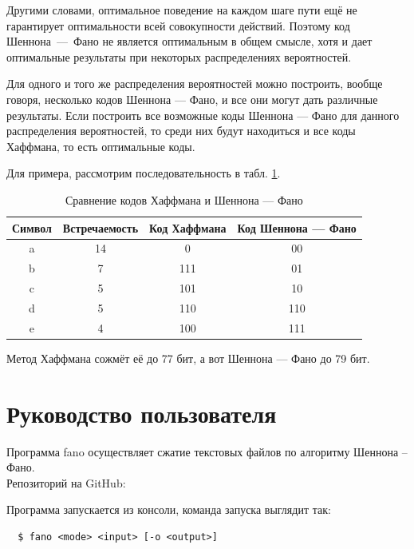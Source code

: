 \documentclass{article}
\begin{document}
Другими словами, 
оптимальное поведение на каждом шаге пути ещё не гарантирует оптимальности всей совокупности действий. 
Поэтому код Шеннона~---~Фано не является оптимальным в общем смысле, хотя и дает оптимальные 
результаты при некоторых распределениях вероятностей. 

Для одного и того же распределения вероятностей 
можно построить, вообще говоря, несколько кодов Шеннона --- Фано, и все они могут дать различные 
результаты. Если построить все возможные коды Шеннона --- Фано для данного распределения вероятностей, 
то среди них будут находиться и все коды Хаффмана, то есть оптимальные коды.

Для примера, рассмотрим последовательность в табл. \ref{hafacomp}. 
\begin{table}
  \begin{center}
    \begin{tabular}{|c|c|c|c|}
      \hline
      Символ & Встречаемость & Код Хаффмана & Код Шеннона --- Фано \\
      \hline
      a & 14 & 0 & 00 \\
      \hline
      b & 7 & 111 & 01 \\
      \hline
      c & 5 & 101 & 10 \\
      \hline
      d & 5 & 110 & 110 \\
      \hline
      e & 4 & 100 & 111 \\
      \hline
    \end{tabular}
    \caption{Сравнение кодов Хаффмана и Шеннона --- Фано\label{hafacomp}}
  \end{center}
\end{table}
Метод Хаффмана сожмёт её до 77 бит, а вот Шеннона --- Фано до 79 бит.

\section{Руководство пользователя}

Программа fano осуществляет сжатие текстовых файлов по алгоритму Шеннона – Фано.\\

Репозиторий на GitHub: 

\vspace{2em}
Программа запускается из консоли, команда запуска выглядит так:

\begin{lstlisting}
  $ fano <mode> <input> [-o <output>]
\end{lstlisting}
\end{document}
